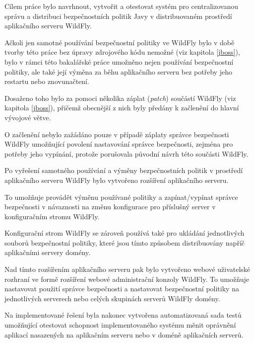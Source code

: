 Cílem práce bylo navrhnout, vytvořit a otestovat systém pro centralizovanou správu a distribuci bezpečnostních politik Javy v distribuovaném prostředí aplikačního serveru WildFly.

Ačkoli jen samotné používání bezpečnostní politiky ve WildFly bylo v době tvorby této práce bez úpravy zdrojového kódu nemožné (viz kapitola \ref{jboss}),
bylo v rámci této bakalářské práce umožněno nejen používání bezpečnostní politiky, ale také její výměna za běhu aplikačního serveru bez potřeby
jeho restartu nebo znovunačtení.

Dosaženo toho bylo za pomoci několika záplat ({\it patch}) součástí WildFly (viz kapitola \ref{jboss}), přičemž obecnější z nich byly předány
k začlenění do hlavní vývojové větve. \cite{smPullRequest}\cite{jbossModulesPullRequest}

O začlenění nebylo zažádáno pouze v případě záplaty správce bezpečnosti WildFly umožňující povolení nastavování správce bezpečnosti,
zejména pro potřeby jeho vypínání, protože porušovala původní návrh této součásti WildFly.

Po vyřešení samotného používání a výměny bezpečnostních politik v prostředí aplikačního serveru WildFly bylo vytvořeno rozšíření aplikačního serveru.

To umožňuje provádět výměnu používané politiky a zapínat/vypínat správce bezpečnosti v návaznosti na změnu konfigurace pro příslušný server
v konfiguračním stromu WildFly.

Konfigurační strom WildFly se zároveň používá také pro ukládání jednotlivých souborů bezpečnostní politiky, které jsou tímto způsobem distribuovány napříč aplikačními servery domény.

Nad tímto rozšířením aplikačního serveru pak bylo vytvořeno webové uživatelské rozhraní ve formě rozšíření webové administrační konzoly WildFly.
To umožňuje nastavovat použití správce bezpečnosti a nastavovat bezpečnostní politiky na jednotlivých serverech nebo celých skupinách serverů WildFly domény.

Na implementované řešení byla nakonec vytvořena automatizovaná sada testů umožňující otestovat schopnost implementovaného systému měnit oprávnění
aplikací nasazených na aplikačním serveru nebo v doméně aplikačních serverů.

